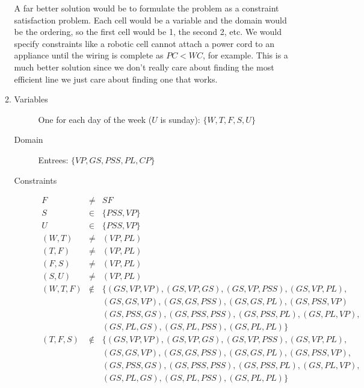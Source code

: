 \documentclass[10pt]{article}
\begin{document}
\begin{enumerate}
\begin{enumerate}
    A far better solution would be to formulate the problem as a constraint
    satisfaction problem.  Each cell would be a variable and the domain would
    be the ordering, so the first cell would be 1, the second 2, etc.  We 
    would specify constraints like a robotic cell cannot attach a power cord 
    to an appliance until the wiring is complete as $PC<WC$, for example.
    This is a much better solution since we don't really care about finding
    the most efficient line we just care about finding one that works.
  \item %
    \begin{description}
    \item[Variables] One for each day of the week ($U$ is sunday): 
                     $\{W,T,F,S,U\}$
    \item[Domain] Entrees: $\{VP, GS, PSS, PL, CP\}$
    \item[Constraints] 
      \begin{eqnarray*}
        F & \neq & SF \\
        S & \in & \{PSS, VP\} \\ 
        U & \in & \{PSS, VP\} \\
        (W,T) & \neq & (VP,PL) \\ 
        (T,F) & \neq & (VP,PL) \\
        (F,S) & \neq & (VP,PL) \\
        (S,U) & \neq & (VP,PL) \\
        (W,T,F) & \notin & \{(GS, VP, VP), (GS, VP, GS), 
                             (GS, VP, PSS), (GS, VP, PL), \\
                &        &   (GS, GS, VP), (GS, GS, PSS), 
                             (GS, GS, PL), (GS, PSS, VP) \\
                &        &   (GS, PSS, GS), (GS, PSS, PSS), 
                             (GS, PSS, PL), (GS, PL, VP), \\
                &        &   (GS, PL, GS), (GS, PL, PSS), (GS, PL, PL)\} \\
        (T,F,S) & \notin & \{(GS, VP, VP), (GS, VP, GS), 
                             (GS, VP, PSS), (GS, VP, PL), \\
                &        &   (GS, GS, VP), (GS, GS, PSS), 
                             (GS, GS, PL), (GS, PSS, VP), \\
                &        &   (GS, PSS, GS), (GS, PSS, PSS), 
                             (GS, PSS, PL), (GS, PL, VP), \\
                &        &   (GS, PL, GS), (GS, PL, PSS), (GS, PL, PL)\} \\

\end{eqnarray*}
\end{description}
\end{enumerate}
\end{enumerate}
\end{document}
